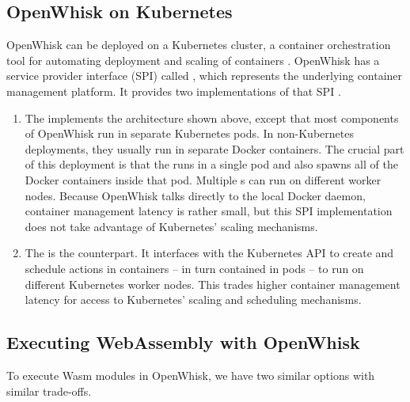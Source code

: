 \subsection{OpenWhisk on Kubernetes}

OpenWhisk can be deployed on a Kubernetes cluster, a container orchestration tool for automating deployment and scaling of containers \cite{Kub2021}. OpenWhisk has a service provider interface (SPI) called , which represents the underlying container management platform. It provides two implementations of that SPI \cite{OWKub2020}.

\begin{enumerate}
    \item The  implements the architecture shown above, except that most components of OpenWhisk run in separate Kubernetes pods. In non-Kubernetes deployments, they usually run in separate Docker containers. The crucial part of this deployment is that the  runs in a single pod and also spawns all of the Docker containers inside that pod. Multiple s can run on different worker nodes. Because OpenWhisk talks directly to the local Docker daemon, container management latency is rather small, but this SPI implementation does not take advantage of Kubernetes' scaling mechanisms.
    \item The  is the counterpart. It interfaces with the Kubernetes API to create and schedule actions in containers -- in turn contained in pods -- to run on different Kubernetes worker nodes. This trades higher container management latency for access to Kubernetes' scaling and scheduling mechanisms.
\end{enumerate}

\subsection{Executing WebAssembly with OpenWhisk}

To execute Wasm modules in OpenWhisk, we have two similar options with similar trade-offs.

